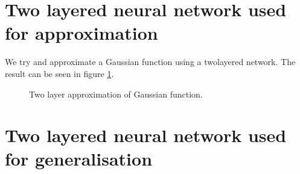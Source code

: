 \documentclass[a4paper,11pt]{article}
\begin{document}
\clearpage
\section{Two layered neural network used for approximation}
We try and approximate a Gaussian function using a twolayered network. The result can be seen in figure \ref{fig:gauss1}.

\begin{figure}[h!]
\label{fig:gauss1}
\caption{Two layer approximation of Gaussian function.}
\end{figure}

\clearpage
\section{Two layered neural network used for generalisation}
\end{document}
